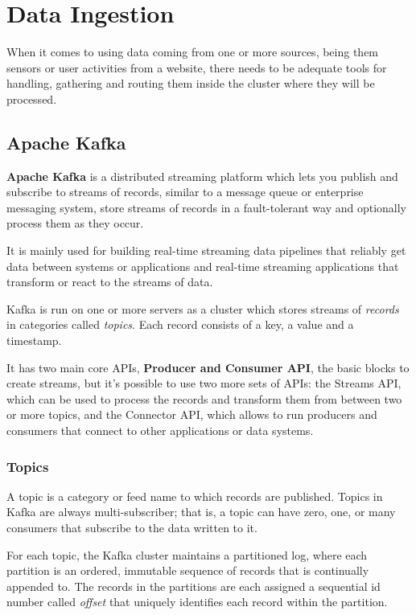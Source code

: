 \chapter{Data Ingestion}

When it comes to using data coming from one or more sources, being them sensors or user activities from a website, there needs to be adequate tools for handling, gathering and routing them inside the cluster where they will be processed.

\section{Apache Kafka}

\textbf{Apache Kafka} is a distributed streaming platform which lets you publish and subscribe to streams of records, similar to a message queue or enterprise messaging system, store streams of records in a fault-tolerant way and optionally process them as they occur. 

It is mainly used for building real-time streaming data pipelines that reliably get data between systems or applications and real-time streaming applications that transform or react to the streams of data.

Kafka is run on one or more servers as a cluster which stores streams of \textit{records} in categories called \textit{topics}. Each record consists of a key, a value and a timestamp.

It has two main core APIs, \textbf{Producer and Consumer API}, the basic blocks to create streams, but it's possible to use two more sets of APIs: the Streams API, which can be used to process the records and transform them from between two or more topics, and the Connector API, which allows to run producers and consumers that connect to other applications or data systems.

\subsection{Topics}

A topic is a category or feed name to which records are published. Topics in Kafka are always multi-subscriber; that is, a topic can have zero, one, or many consumers that subscribe to the data written to it.

For each topic, the Kafka cluster maintains a partitioned log, where each partition is an ordered, immutable sequence of records that is continually appended to. The records in the partitions are each assigned a sequential id number called \textit{offset} that uniquely identifies each record within the partition.

